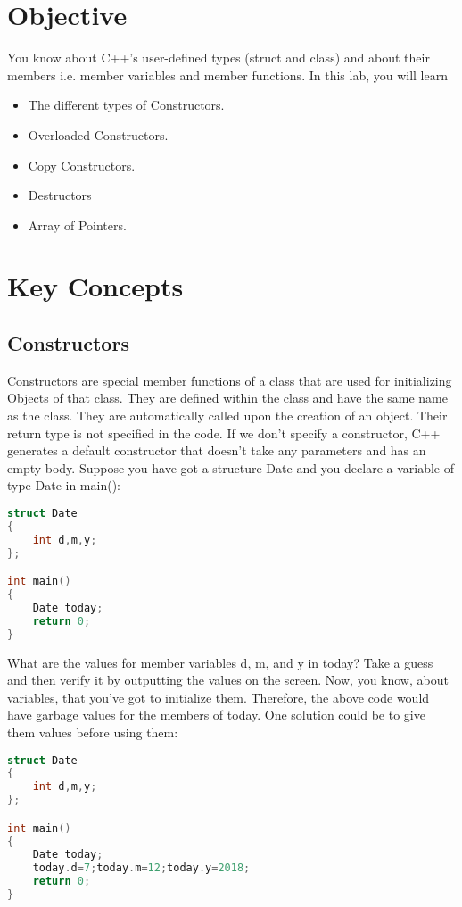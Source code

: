 \documentclass[11pt,fleqn]{book} %
\begin{document}
\section{Objective}

You know about C++'s user-defined types (struct and class) and about their members i.e. member variables and member functions. In this lab, you will learn

\begin{itemize}
	\item The different types of Constructors.
	\item Overloaded Constructors.
	\item Copy Constructors.
	\item Destructors
	\item Array of Pointers.
\end{itemize}


\section{Key Concepts}

\subsection{Constructors}

Constructors are special member functions of a class that are used for initializing Objects of that class. They are defined within the class and have the same name as the class. They are automatically called upon the creation of an object. Their return type is not specified in the code. If we don't specify a constructor, C++ generates a default constructor that doesn't take any parameters and has an empty body. Suppose you have got a structure Date and you declare a variable of type Date in main():

\begin{lstlisting}[language=C++, caption = Uninitialized members]
struct Date 
{
	int d,m,y;
};

int main() 
{
	Date today;
	return 0;
}
\end{lstlisting}

\noindent What are the values for member variables d, m, and y in today? Take a guess and then verify it by outputting the values on the screen. Now, you know, about variables, that you've got to initialize them. Therefore, the above code would have garbage values for the members of today. One solution could be to give them values before using them:
\begin{lstlisting}[language=C++, caption = Initializing members]
struct Date 
{
	int d,m,y;
};

int main()
{
	Date today; 
	today.d=7;today.m=12;today.y=2018;
	return 0;
}
\end{lstlisting}
\end{document}
